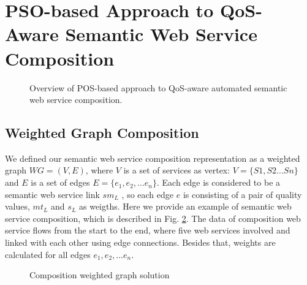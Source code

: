 \documentclass{IEEEtran}
\begin{document}
\section{PSO-based Approach to QoS-Aware Semantic Web Service Composition}\label{qswsc_approach}

\begin{figure}[h]
\centering
{}
 \caption{Overview of POS-based approach to QoS-aware automated semantic web service composition.}
 \label{overview}
\end{figure}

\subsection{Weighted Graph Composition}

We defined our semantic web service composition representation as a weighted graph $WG = (V, E)$, where $V$ is a set of services as vertex: $V=\{S1, S2...Sn \}$ and $E$ is a set of edges $E = \{e_{1}, e_{2},... e_{n} \}$. Each edge is considered to be a semantic web service link $sm_{L}$ , so each edge $e$ is consisting of a pair of quality values, $mt_{L}$ and $s_{L}$ as weigths. Here we provide an example of semantic web service composition, which is described in Fig. \ref{wscs}. The data of composition web service flows from the start to the end, where five web services involved and linked with each other using edge connections. Besides that, weights are calculated for all edges $e_{1}, e_{2},... e_{n}$.

\begin{figure}[h]
\centering
{}
 \caption{Composition weighted graph solution}
 \label{wscs}
\end{figure}
\end{document}
